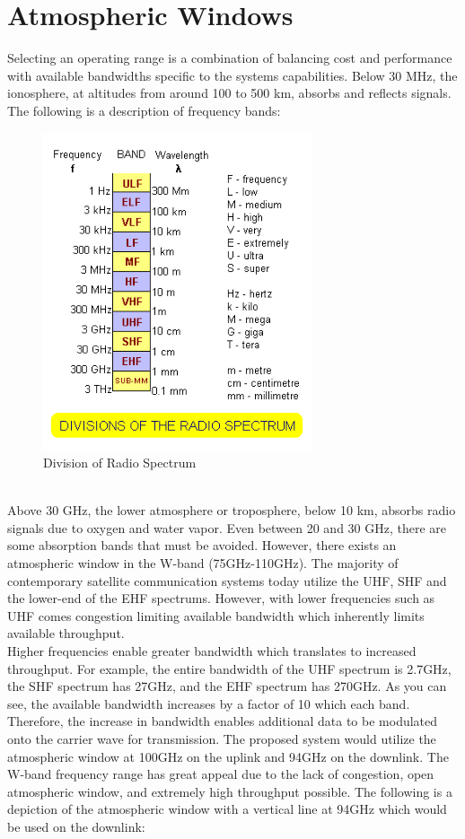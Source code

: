 \documentclass[conference]{IEEEtran}
\begin{document}
\section{Atmospheric Windows}
Selecting an operating range is a combination of balancing cost and performance with available bandwidths specific to the systems capabilities. Below 30 MHz, the ionosphere, at altitudes from around 100 to 500 km, absorbs and reflects signals. The following is a description of frequency bands:
\begin{figure}[h]
\centerline{\includegraphics{divisions_of_radio_spectrum300.png}}
\caption{Division of Radio Spectrum}
\label{fig:1}
\end{figure}
\\Above 30 GHz, the lower atmosphere or troposphere, below 10 km, absorbs radio signals due to oxygen and water vapor. Even between 20 and 30 GHz, there are some absorption bands that must be avoided. However, there exists an atmospheric window in the W-band (75GHz-110GHz). The majority of contemporary satellite communication systems today utilize the UHF, SHF and the lower-end of the EHF spectrums. However, with lower frequencies such as UHF comes congestion limiting available bandwidth which inherently limits available throughput.\\
Higher frequencies enable greater bandwidth which translates to increased throughput. For example, the entire bandwidth of the UHF spectrum is 2.7GHz, the SHF spectrum has 27GHz, and the EHF spectrum has 270GHz. As you can see, the available bandwidth increases by a factor of 10 which each band. Therefore, the increase in bandwidth enables additional data to be modulated onto the carrier wave for transmission. The proposed system would utilize the atmospheric window at 100GHz on the uplink and 94GHz on the downlink. The W-band frequency range has great appeal due to the lack of congestion, open atmospheric window, and extremely high throughput possible. The following is a depiction of the atmospheric window with a vertical line at 94GHz which would be used on the downlink:
\end{document}
